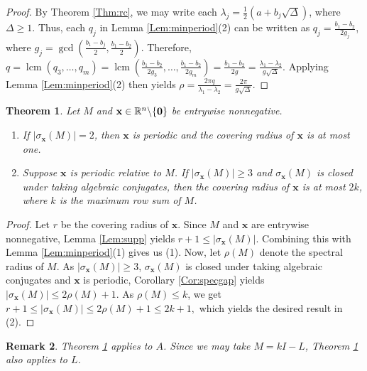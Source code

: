 \documentclass[11pt]{article}
\newtheorem{theorem}{Theorem}
\newtheorem{remark}[theorem]{Remark}
\newcommand{\zero}{{\bf{0}}}
\newcommand{\bx}{\mathbf x}
\def\R{\mathbb{R}}
\begin{document}
\begin{proof}
By Theorem \ref{Thm:rc}, we may write each $\lambda_j=\frac{1}{2}(a+b_j\sqrt{\Delta})$, where $\Delta\geq 1$. %
Thus, each $q_j$ in Lemma \ref{Lem:minperiod}(2) can be written as $q_j=\frac{b_1-b_2}{2g_j}$, where $g_j=\operatorname{gcd}\left(\frac{b_1-b_j}{2},\frac{b_1-b_2}{2}\right)$. Therefore, $q=\operatorname{lcm}(q_3,\ldots,q_m)=\operatorname{lcm}\left(\frac{b_1-b_2}{2g_3},\ldots,\frac{b_1-b_2}{2g_m}\right)=\frac{b_1-b_2}{2g}=\frac{\lambda_1-\lambda_2}{g\sqrt{\Delta}}$. Applying Lemma \ref{Lem:minperiod}(2) then yields $\rho=\frac{2\pi q}{\lambda_1-\lambda_2}=\frac{2\pi}{g\sqrt{\Delta}}$.
\end{proof}

\begin{theorem}
\label{Thm:covrad}
Let $M$ and $\bx\in\R^n\backslash\{\zero\}$ be entrywise nonnegative. 

\begin{enumerate}
\item If $|\sigma_{\bx}(M)|=2$, then $\bx$ is periodic and the covering radius of $\bx$ is at most one.
\item Suppose $\bx$ is periodic relative to $M$. If $|\sigma_{\bx}(M)|\geq 3$ and $\sigma_{\bx}(M)$ is closed under taking algebraic conjugates, then the covering radius of $\bx$ is at most $2k$, where $k$ is the maximum row sum of $M$.
\end{enumerate}
\end{theorem}

\begin{proof}
Let $r$ be the covering radius of $\bx$. Since $M$ and $\bx$ are entrywise nonnegative, Lemma \ref{Lem:supp} yields $r+1\leq |\sigma_{\bx}(M)|$. Combining this with Lemma \ref{Lem:minperiod}(1) gives us (1). Now, let $\rho(M)$ denote the spectral radius of $M$. As $|\sigma_{\bx}(M)|\geq 3$, $\sigma_{\bx}(M)$ is closed under taking algebraic conjugates and $\bx$ is periodic, Corollary \ref{Cor:specgap} yields $|\sigma_{\bx}(M)|\leq 2\rho(M)+1$. As $\rho(M)\leq k$, we get $r+1\leq |\sigma_{\bx}(M)|\leq 2\rho(M)+1\leq 2k+1,$ which yields the desired result in (2).
\end{proof}

\begin{remark}
\label{Rem:lapcovrad}
Theorem \ref{Thm:covrad} applies to $A$. Since we may take $M=kI-L$, Theorem \ref{Thm:covrad} also applies to $L$. 
\end{remark}
\end{document}
